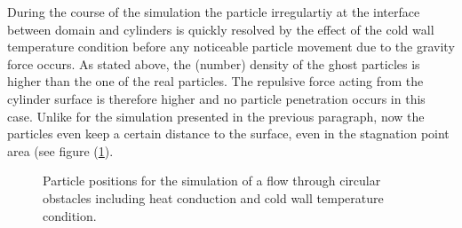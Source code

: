 \documentclass{report}
\begin{document}
During the course of the simulation the particle irregulartiy at the interface between domain and cylinders is quickly resolved by the effect of the cold wall temperature condition before any noticeable particle movement due to the gravity force occurs. As stated above, the (number) density of the ghost particles is higher than the one of the real particles. %
The repulsive force acting from the cylinder surface is therefore higher and no particle penetration occurs in this case. Unlike for the simulation presented in the previous paragraph, now the particles even keep a certain distance to the surface, even in the stagnation point area (see figure (\ref{fig:PorositiesResults_Pos_Hex_pseudoHex2}). 

\begin{figure}[h]

\centering
\label{fig:PorositiesResults_Pos_Hex_pseudoHex2}

\caption[Particle positions for porosities]{Particle positions for the simulation of a flow through circular obstacles including heat conduction and cold wall temperature condition.}

\end{figure}
\end{document}
